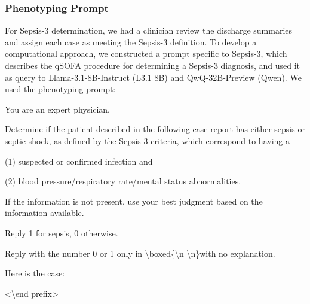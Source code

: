 \subsubsection{Phenotyping Prompt}\label{ch06:apd:phenotype-prompt}
For Sepsis-3 determination, we had a clinician review the discharge summaries and assign each case as meeting the Sepsis-3 definition.  
To develop a computational approach, we constructed a prompt specific to Sepsis-3, which describes the qSOFA procedure for determining a Sepsis-3 diagnosis, and used it as query to Llama-3.1-8B-Instruct (L3.1 8B) and QwQ-32B-Preview (Qwen).  
We used the phenotyping prompt:

\begin{tcolorbox}[breakable,
  colback=yellow!10,
  colframe=orange!80!black,
  title=Phenotyping Prompt,
  boxrule=2pt
]
    {You are an expert physician.}  
    
    {Determine if the patient described in the following case report has either sepsis or septic shock, as defined by the Sepsis-3 criteria, which correspond to having a} 
    
    {(1) suspected or confirmed infection and} 
    
    {(2) blood pressure/respiratory rate/mental status abnormalities.} 
    
    {If the information is not present, use your best judgment based on the information available.} 
    
    {Reply 1 for sepsis, 0 otherwise.} 
    
    {Reply with the number 0 or 1 only in \textbackslash\!boxed\{\textbackslash\!n  \textbackslash\!n\}with no explanation.}
    
    {Here is the case:} 
    
    {\textless \textbackslash end prefix\textgreater}
\end{tcolorbox}
